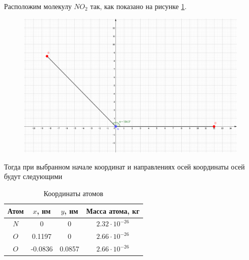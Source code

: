 Расположим молекулу $NO_2$ так, как показано на рисунке \ref{fig:geogebra-export}. 
\begin{figure}
	\centering
	\includegraphics[width=0.7\linewidth]{geogebra-export}
	\caption{}
	\label{fig:geogebra-export}
\end{figure}

Тогда при выбранном начале координат и направлениях осей координаты осей будут следующими
\begin{table}[h!]
	\centering
	\caption{Координаты атомов}
	\label{tab3}
	\setlength{\extrarowheight}{1mm}
	\begin{tabular}{|c|c|c|c|}
		\hline 
		Атом & $x$, нм & $y$, нм & Масса атома, кг \\ 
		\hline 
		$N$ & 0 & 0 & $2.32\cdot10^{-26}$ \\ 
		\hline 
		$O$ & 0.1197 & 0 & $2.66\cdot10^{-26}$ \\ 
		\hline 
		$O$ & -0.0836 & 0.0857 & $2.66\cdot10^{-26}$ \\ 
		\hline 
	\end{tabular} 
\end{table}

